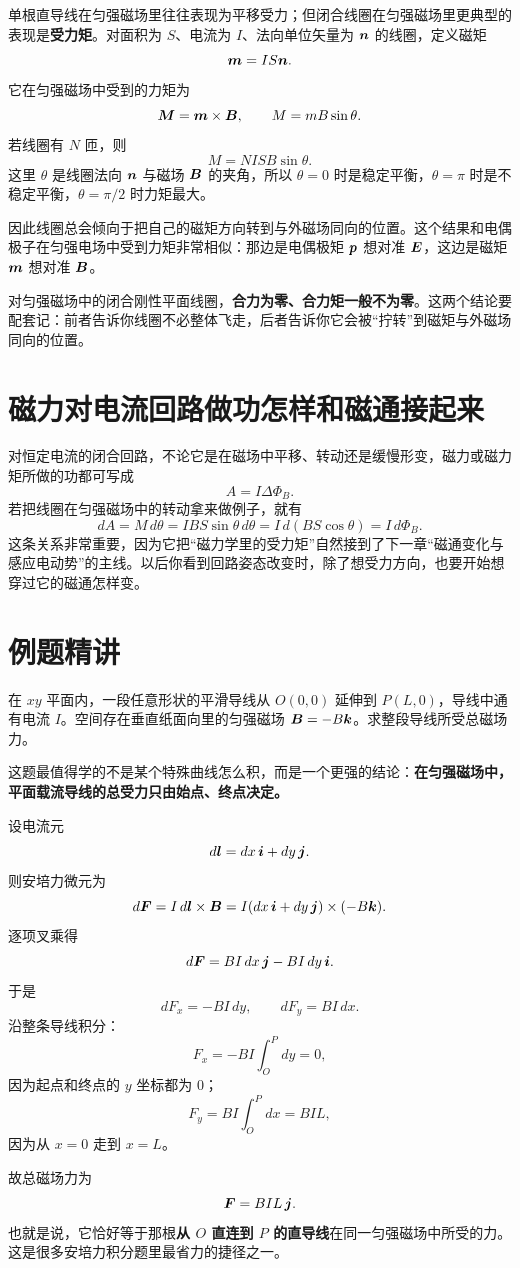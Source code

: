 \documentclass[lang=cn,11pt]{elegantbook}
\begin{document}
单根直导线在匀强磁场里往往表现为平移受力；但闭合线圈在匀强磁场里更典型的表现是\textbf{受力矩}。对面积为 \(S\)、电流为 \(I\)、法向单位矢量为 \(\vb*{n}\) 的线圈，定义磁矩
\[
\vb*{m}=IS\vb*{n}.
\]
它在匀强磁场中受到的力矩为
\[
\vb*{M}=\vb*{m}\times \vb*{B},
\qquad
M=mB\sin\theta.
\]
若线圈有 \(N\) 匝，则
\[
M=NISB\sin\theta.
\]
这里 \(\theta\) 是线圈法向 \(\vb*{n}\) 与磁场 \(\vb*{B}\) 的夹角，所以 \(\theta=0\) 时是稳定平衡，\(\theta=\pi\) 时是不稳定平衡，\(\theta=\pi/2\) 时力矩最大。

因此线圈总会倾向于把自己的磁矩方向转到与外磁场同向的位置。这个结果和电偶极子在匀强电场中受到力矩非常相似：那边是电偶极矩 \(\vb*{p}\) 想对准 \(\vb*{E}\)，这边是磁矩 \(\vb*{m}\) 想对准 \(\vb*{B}\)。

\begin{remark}
对匀强磁场中的闭合刚性平面线圈，\textbf{合力为零、合力矩一般不为零}。这两个结论要配套记：前者告诉你线圈不必整体飞走，后者告诉你它会被“拧转”到磁矩与外磁场同向的位置。
\end{remark}

\section{磁力对电流回路做功怎样和磁通接起来}

对恒定电流的闭合回路，不论它是在磁场中平移、转动还是缓慢形变，磁力或磁力矩所做的功都可写成
\[
A=I\Delta\Phi_B.
\]
若把线圈在匀强磁场中的转动拿来做例子，就有
\[
dA=M\,d\theta=IBS\sin\theta\,d\theta
=I\,d(BS\cos\theta)
=I\,d\Phi_B.
\]
这条关系非常重要，因为它把“磁力学里的受力矩”自然接到了下一章“磁通变化与感应电动势”的主线。以后你看到回路姿态改变时，除了想受力方向，也要开始想穿过它的磁通怎样变。

\section{例题精讲}

\begin{example}[任意平面载流导线在匀强磁场中的总受力]
在 \(xy\) 平面内，一段任意形状的平滑导线从 \(O(0,0)\) 延伸到 \(P(L,0)\)，导线中通有电流 \(I\)。空间存在垂直纸面向里的匀强磁场 \(\vb*{B}=-B\vb*{k}\)。求整段导线所受总磁场力。
\end{example}

\begin{solution}
这题最值得学的不是某个特殊曲线怎么积，而是一个更强的结论：\textbf{在匀强磁场中，平面载流导线的总受力只由始点、终点决定。}

设电流元
\[
d\vb*{l}=dx\,\vb*{i}+dy\,\vb*{j}.
\]
则安培力微元为
\[
d\vb*{F}=I\,d\vb*{l}\times \vb*{B}
=I(dx\,\vb*{i}+dy\,\vb*{j})\times(-B\vb*{k}).
\]
逐项叉乘得
\[
d\vb*{F}=BI\,dx\,\vb*{j}-BI\,dy\,\vb*{i}.
\]
于是
\[
dF_x=-BI\,dy,\qquad dF_y=BI\,dx.
\]
沿整条导线积分：
\[
F_x=-BI\int_O^P dy=0,
\]
因为起点和终点的 \(y\) 坐标都为 \(0\)；
\[
F_y=BI\int_O^P dx=BIL,
\]
因为从 \(x=0\) 走到 \(x=L\)。

故总磁场力为
\[
\vb*{F}=BIL\,\vb*{j}.
\]
也就是说，它恰好等于那根\textbf{从 \(O\) 直连到 \(P\) 的直导线}在同一匀强磁场中所受的力。这是很多安培力积分题里最省力的捷径之一。
\end{solution}
\end{document}
